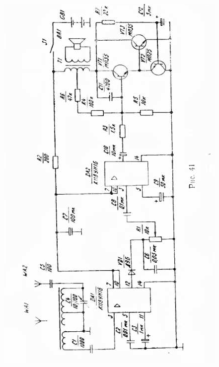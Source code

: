 \documentclass[12pt]{article}
\begin{document}
\hspace*{0.7cm}\includegraphics[scale=0.99, angle=-1]{ekon3_040_1}

\newpage

\hrulefill
\end{document}
